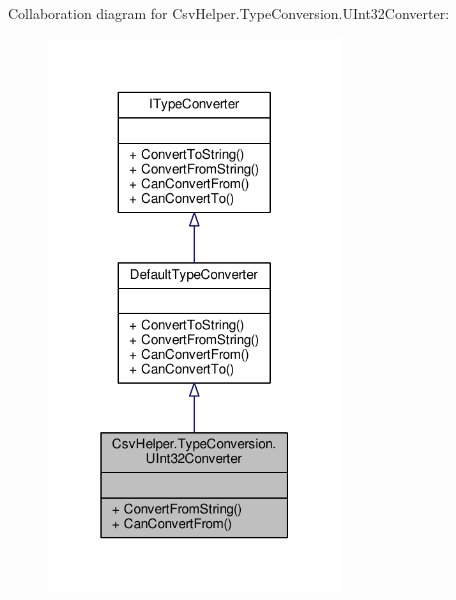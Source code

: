 Collaboration diagram for Csv\-Helper.\-Type\-Conversion.\-U\-Int32\-Converter\-:
\nopagebreak
\begin{figure}[H]
\begin{center}
\leavevmode
\includegraphics[width=220pt]{a00585}
\end{center}
\end{figure}
